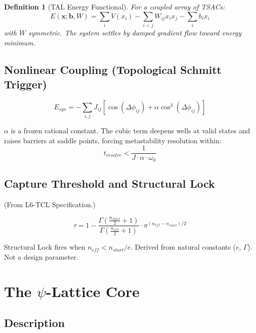 \documentclass[11pt, a4paper]{report}
\newtheorem{definition}{Definition}[chapter]
\begin{document}
\begin{definition}[TAL Energy Functional]
For a coupled array of TSACs:
\begin{equation}
  E(\mathbf{x}; \mathbf{b}, W) = \sum_i V(x_i) - \sum_{i<j} W_{ij} x_i x_j - \sum_i b_i x_i
\end{equation}
with $W$ symmetric. The system settles by damped gradient flow toward
energy minimum.
\end{definition}

\section{Nonlinear Coupling (Topological Schmitt Trigger)}

\begin{equation}
  E_{sys} = -\sum_{i,j} J_{ij} \left[ \cos(\Delta\phi_{ij})
            + \alpha \cos^3(\Delta\phi_{ij}) \right]
\end{equation}

$\alpha$ is a frozen rational constant. The cubic term deepens wells at
valid states and raises barriers at saddle points, forcing metastability
resolution within:
\begin{equation}
  t_{resolve} < \frac{1}{J \cdot \alpha \cdot \omega_0}
\end{equation}

\section{Capture Threshold and Structural Lock}

(From L6-TCL Specification.)

\begin{equation}
  \tau = 1 - \frac{\Gamma\!\left(\frac{n_{start}}{2}+1\right)}
                  {\Gamma\!\left(\frac{n_{eff}}{2}+1\right)}
  \cdot \pi^{(n_{eff}-n_{start})/2}
\end{equation}

Structural Lock fires when $n_{eff} < n_{start}/e$. Derived from
natural constants ($e$, $\Gamma$). Not a design parameter.

\chapter{The $\psi$-Lattice Core}

\section{Description}
\end{document}
